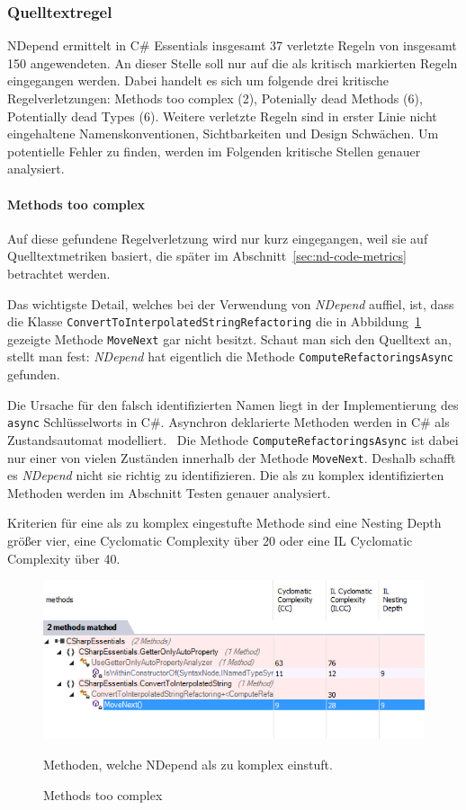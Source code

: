 \subsubsection{Quelltextregel}
NDepend ermittelt in C\# Essentials insgesamt 37 verletzte Regeln von insgesamt 150 angewendeten. An dieser Stelle soll nur auf die als kritisch markierten Regeln eingegangen werden. Dabei handelt es sich um folgende drei kritische Regelverletzungen: Methods too complex (2), Potenially dead Methods (6), Potentially dead Types (6). Weitere verletzte Regeln sind in erster Linie nicht eingehaltene Namenskonventionen, Sichtbarkeiten und Design Schwächen. Um potentielle Fehler zu finden, werden im Folgenden kritische Stellen genauer analysiert.

\paragraph{Methods too complex}
Auf diese gefundene Regelverletzung wird nur kurz eingegangen, weil sie auf Quelltextmetriken basiert, die später im Abschnitt~\ref{sec:nd-code-metrics} betrachtet werden.

Das wichtigste Detail, welches bei der Verwendung von \emph{NDepend} auffiel, ist, dass die Klasse \texttt{ConvertToInterpolatedStringRefactoring} die in Abbildung~\ref{fig:nd-methode-too-complex} gezeigte Methode \texttt{MoveNext} gar nicht besitzt. Schaut man sich den Quelltext an, stellt man fest: \emph{NDepend} hat eigentlich die Methode \texttt{ComputeRefactoringsAsync} gefunden.

Die Ursache für den falsch identifizierten Namen liegt in der Implementierung des \texttt{async} Schlüsselworts in C\#. Asynchron deklarierte Methoden werden in C\# als Zustandsautomat modelliert.~\cite{csharp-async} Die Methode \texttt{ComputeRefactoringsAsync} ist dabei nur einer von vielen Zuständen innerhalb der Methode \texttt{MoveNext}. Deshalb schafft es \emph{NDepend} nicht sie richtig zu identifizieren. Die als zu komplex identifizierten Methoden werden im Abschnitt Testen genauer analysiert.

Kriterien für eine als zu komplex eingestufte Methode sind eine Nesting Depth größer vier, eine Cyclomatic Complexity über 20 oder eine IL Cyclomatic Complexity über 40.~\cite{nd-cc-criteria}

\begin{figure}[!ht]
	\centering
	\includegraphics[width=\textwidth]{images/methode-too-complex.png}
	\caption{Methods too complex}
	\vspace{0.1cm}
	Methoden, welche NDepend als zu komplex einstuft.
	\label{fig:nd-methode-too-complex}
\end{figure}

